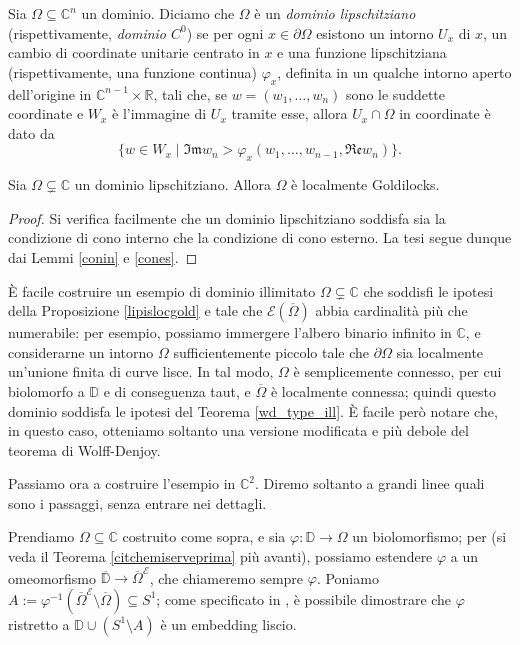\begin{defn}
    Sia $\Omega\subseteq\mathbb{C}^n$ un dominio. Diciamo che $\Omega$ è un \textit{dominio lipschitziano} (rispettivamente, \textit{dominio $C^0$}) se per ogni $x\in\partial\Omega$ esistono un intorno $U_x$ di $x$, un cambio di coordinate unitarie centrato in $x$ e una funzione lipschitziana (rispettivamente, una funzione continua) $\varphi_x$, definita in un qualche intorno aperto dell'origine in $\mathbb{C}^{n-1}\times\mathbb{R}$, tali che, se $w=(w_1,\dots,w_n)$ sono le suddette coordinate e $W_x$ è l'immagine di $U_x$ tramite esse, allora $U_x\cap\Omega$ in coordinate è dato da
    $$\{w\in W_x\mid \mathfrak{Im}w_n>\varphi_x(w_1,\dots,w_{n-1},\mathfrak{Re}w_n)\}.$$
\end{defn}

\begin{prop} \label{lipislocgold}
    Sia $\Omega\subsetneq\mathbb{C}$ un dominio lipschitziano. Allora $\Omega$ è localmente Goldilocks.
\end{prop}

\begin{proof}
    Si verifica facilmente che un dominio lipschitziano soddisfa sia la condizione di cono interno che la condizione di cono esterno. La tesi segue dunque dai Lemmi \ref{conin} e \ref{cones}.
\end{proof}

È facile costruire un esempio di dominio illimitato $\Omega\subsetneq\mathbb{C}$ che soddisfi le ipotesi della Proposizione \ref{lipislocgold} e tale che $\mathcal{E}(\overline{\Omega})$ abbia cardinalità più che numerabile: per esempio, possiamo immergere l'albero binario infinito in $\mathbb{C}$, e considerarne un intorno $\Omega$ sufficientemente piccolo tale che $\partial\Omega$ sia localmente un'unione finita di curve lisce. In tal modo, $\Omega$ è semplicemente connesso, per cui biolomorfo a $\mathbb{D}$ e di conseguenza taut, e $\overline{\Omega}$ è localmente connessa; quindi questo dominio soddisfa le ipotesi del Teorema \ref{wd_type_ill}. È facile però notare che, in questo caso, otteniamo soltanto una versione modificata e più debole del teorema di Wolff-Denjoy.

Passiamo ora a costruire l'esempio in $\mathbb{C}^2$. Diremo soltanto a grandi linee quali sono i passaggi, senza entrare nei dettagli.

Prendiamo $\Omega\subseteq\mathbb{C}$ costruito come sopra, e sia $\varphi:\mathbb{D}\longrightarrow\Omega$ un biolomorfismo; per \cite[Theorem 1.9]{BZ2} (si veda il Teorema \ref{citchemiserveprima} più avanti), possiamo estendere $\varphi$ a un omeomorfismo $\overline{\mathbb{D}}\longrightarrow\overline{\Omega}^\mathcal{E}$, che chiameremo sempre $\varphi$. Poniamo ${A:=\varphi^{-1}(\overline{\Omega}^\mathcal{E}\setminus\overline{\Omega})\subseteq S^1}$; come specificato in \cite[Section 2.3]{BZ2}, è possibile dimostrare che $\varphi$ ristretto a $\mathbb{D}\cup(S^1\setminus A)$ è un embedding liscio.

